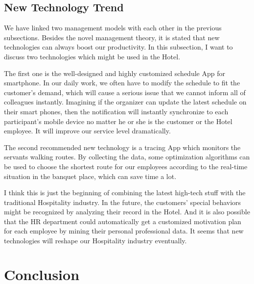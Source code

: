 \documentclass[12pt,onecolumn,a4paper]{IEEEtran}
\begin{document}
\subsection{\textbf{New Technology Trend}}
We have linked two management models with each other in the previous subsections. Besides the novel management theory, it is stated that new technologies can always boost our productivity. In this subsection, I want to discuss two technologies which might be used in the Hotel. 

The first one is the well-designed and highly customized schedule App for smartphone. In our daily work, we often have to modify the schedule to fit the customer's demand, which will cause a serious issue that we cannot inform all of colleagues instantly. Imagining if the organizer can update the latest schedule on their smart phones, then the notification will instantly synchronize to each participant's mobile device no matter he or she is the customer or the Hotel employee. It will improve our service level dramatically.

The second recommended new technology is a tracing App which monitors the servants walking routes. By collecting the data, some optimization algorithms can be used to choose the shortest route for our employees according to the real-time situation in the banquet place, which can save time a lot.

I think this is just the beginning of combining the latest high-tech stuff with the traditional Hospitality industry. In the future, the customers' special behaviors might be recognized by analyzing their record in the Hotel. And it is also possible that the HR department could automatically get a customized motivation plan for each employee by mining their personal professional data. It seems that new technologies will reshape our Hospitality industry eventually. 
\newpage
\section{\textbf{Conclusion}}


\newpage


\renewcommand\refname{Reference}
\small


\end{document}
